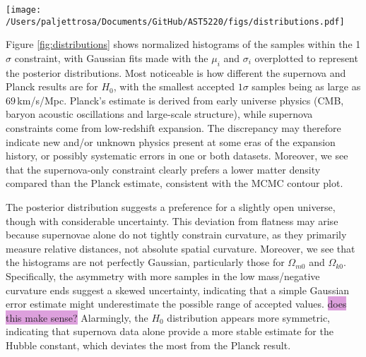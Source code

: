 \documentclass{aa}
\begin{document}

\begin{figure*}
  \centering
  \texttt{[image: /Users/paljettrosa/Documents/GitHub/AST5220/figs/distributions.pdf]}
  \caption{Histograms of the MCMC posterior distributions for the parameters $(H_0,\Omega_{m0}, \Omega_{k0}, \Omega_{\Lambda0})$, compared with Gaussian fits (solid curves) and Planck values. Deviations from Gaussianity indicate asymmetries in parameter uncertainties.}\label{fig:distributions}
\end{figure*}

Figure \ref{fig:distributions} shows normalized histograms of the samples within the 1$\sigma$ constraint, with Gaussian fits made with the $\mu_i$ and $\sigma_i$ overplotted to represent the posterior distributions. Most noticeable is how different the supernova and Planck results are for $H_0$, with the smallest accepted $1\sigma$ samples being as large as $69\,$km/s/Mpc. Planck's estimate is derived from early universe physics (CMB, baryon acoustic oscillations and large-scale structure), while supernova constraints come from low-redshift expansion. The discrepancy may therefore indicate new and/or unknown physics present at some eras of the expansion history, or possibly systematic errors in one or both datasets. Moreover, we see that the supernova-only constraint clearly prefers a lower matter density compared than the Planck estimate, consistent with the MCMC contour plot.

The posterior distribution suggests a preference for a slightly open universe, though with considerable uncertainty. This deviation from flatness may arise because supernovae alone do not tightly constrain curvature, as they primarily measure relative distances, not absolute spatial curvature. Moreover, we see that the histograms are not perfectly Gaussian, particularly those for $\Omega_{m0}$ and $\Omega_{k0}$. Specifically, the asymmetry with more samples in the low mass/negative curvature ends suggest a skewed uncertainty, indicating that a simple Gaussian error estimate might underestimate the possible range of accepted values. \colorbox{Plum}{does this make sense?} Alarmingly, the $H_0$ distribution appears more symmetric, indicating that supernova data alone provide a more stable estimate for the Hubble constant, which deviates the most from the Planck result.
\end{document}
